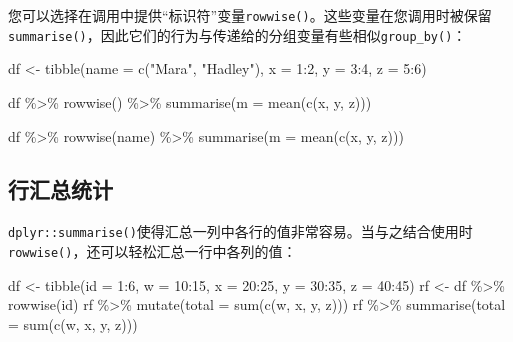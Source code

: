 \documentclass[
]{book}
\newenvironment{Shaded}{\begin{snugshade}}{\end{snugshade}}
\newcommand{\AttributeTok}[1]{\textcolor[rgb]{0.77,0.63,0.00}{#1}}
\newcommand{\DecValTok}[1]{\textcolor[rgb]{0.00,0.00,0.81}{#1}}
\newcommand{\FunctionTok}[1]{\textcolor[rgb]{0.00,0.00,0.00}{#1}}
\newcommand{\NormalTok}[1]{#1}
\newcommand{\OtherTok}[1]{\textcolor[rgb]{0.56,0.35,0.01}{#1}}
\newcommand{\SpecialCharTok}[1]{\textcolor[rgb]{0.00,0.00,0.00}{#1}}
\newcommand{\StringTok}[1]{\textcolor[rgb]{0.31,0.60,0.02}{#1}}
\begin{document}
您可以选择在调用中提供``标识符''变量\texttt{rowwise()}。这些变量在您调用时被保留\texttt{summarise()}，因此它们的行为与传递给的分组变量有些相似\texttt{group\_by()}：

\begin{Shaded}
\begin{Highlighting}[]
\NormalTok{df }\OtherTok{\textless{}{-}} \FunctionTok{tibble}\NormalTok{(}\AttributeTok{name =} \FunctionTok{c}\NormalTok{(}\StringTok{"Mara"}\NormalTok{, }\StringTok{"Hadley"}\NormalTok{), }\AttributeTok{x =} \DecValTok{1}\SpecialCharTok{:}\DecValTok{2}\NormalTok{, }\AttributeTok{y =} \DecValTok{3}\SpecialCharTok{:}\DecValTok{4}\NormalTok{, }\AttributeTok{z =} \DecValTok{5}\SpecialCharTok{:}\DecValTok{6}\NormalTok{)}

\NormalTok{df }\SpecialCharTok{\%\textgreater{}\%} 
  \FunctionTok{rowwise}\NormalTok{() }\SpecialCharTok{\%\textgreater{}\%} 
  \FunctionTok{summarise}\NormalTok{(}\AttributeTok{m =} \FunctionTok{mean}\NormalTok{(}\FunctionTok{c}\NormalTok{(x, y, z)))}

\NormalTok{df }\SpecialCharTok{\%\textgreater{}\%} 
  \FunctionTok{rowwise}\NormalTok{(name) }\SpecialCharTok{\%\textgreater{}\%} 
  \FunctionTok{summarise}\NormalTok{(}\AttributeTok{m =} \FunctionTok{mean}\NormalTok{(}\FunctionTok{c}\NormalTok{(x, y, z)))}
\end{Highlighting}
\end{Shaded}

\hypertarget{ux884cux6c47ux603bux7edfux8ba1}{%
\subsection{行汇总统计}\label{ux884cux6c47ux603bux7edfux8ba1}}

\texttt{dplyr::summarise()}使得汇总一列中各行的值非常容易。当与之结合使用时\texttt{rowwise()}，还可以轻松汇总一行中各列的值：

\begin{Shaded}
\begin{Highlighting}[]
\NormalTok{df }\OtherTok{\textless{}{-}} \FunctionTok{tibble}\NormalTok{(}\AttributeTok{id =} \DecValTok{1}\SpecialCharTok{:}\DecValTok{6}\NormalTok{, }\AttributeTok{w =} \DecValTok{10}\SpecialCharTok{:}\DecValTok{15}\NormalTok{, }\AttributeTok{x =} \DecValTok{20}\SpecialCharTok{:}\DecValTok{25}\NormalTok{, }\AttributeTok{y =} \DecValTok{30}\SpecialCharTok{:}\DecValTok{35}\NormalTok{, }\AttributeTok{z =} \DecValTok{40}\SpecialCharTok{:}\DecValTok{45}\NormalTok{)}
\NormalTok{rf }\OtherTok{\textless{}{-}}\NormalTok{ df }\SpecialCharTok{\%\textgreater{}\%} \FunctionTok{rowwise}\NormalTok{(id)}
\NormalTok{rf }\SpecialCharTok{\%\textgreater{}\%} \FunctionTok{mutate}\NormalTok{(}\AttributeTok{total =} \FunctionTok{sum}\NormalTok{(}\FunctionTok{c}\NormalTok{(w, x, y, z)))}
\NormalTok{rf }\SpecialCharTok{\%\textgreater{}\%} \FunctionTok{summarise}\NormalTok{(}\AttributeTok{total =} \FunctionTok{sum}\NormalTok{(}\FunctionTok{c}\NormalTok{(w, x, y, z)))}
\end{Highlighting}
\end{Shaded}
\end{document}
